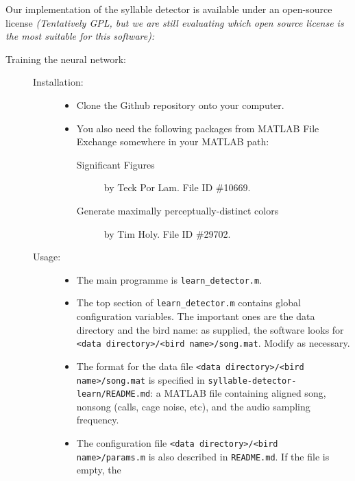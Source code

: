 \documentclass[10pt,letterpaper]{article}
\begin{document}
\noindent Our implementation of the syllable
detector is available under an open-source license {\em (Tentatively GPL, but we are still evaluating which open source license is the most suitable for this software):}
\begin{description}
\item[Training the neural network:]\hfill

  \begin{description}
  \item[Installation:]\hfill
    \begin{itemize}
    \item Clone the Github repository onto your computer.
    \item You also need the following packages from MATLAB File Exchange somewhere in your MATLAB path:
      \begin{description}
      \item[Significant Figures] by Teck Por Lam.  File ID \#10669.
      \item[Generate maximally perceptually-distinct colors] by Tim Holy.  File ID \#29702.
      \end{description}
    \end{itemize}
  \item[Usage:]\hfill
    \begin{itemize}
      \item The main programme is {\tt learn\_detector.m}.
    \item The top section of {\tt learn\_detector.m} contains global
      configuration variables.  The important ones are the data
      directory and the bird name: as supplied, the software looks for
      {\tt \textless data directory\textgreater/\textless bird
        name\textgreater/song.mat}.  Modify as necessary.
    \item The format for the data file {\tt \textless data
      directory\textgreater/\textless bird name\textgreater/song.mat}
      is specified in {\tt syllable-detector-learn/README.md}: a
      MATLAB file containing aligned song, nonsong (calls, cage noise,
      etc), and the audio sampling frequency.
    \item The configuration file {\tt \textless data
      directory\textgreater/\textless bird name\textgreater/params.m}
      is also described in {\tt README.md}.  If the file is empty, the

\end{itemize}
\end{description}
\end{description}
\end{document}
